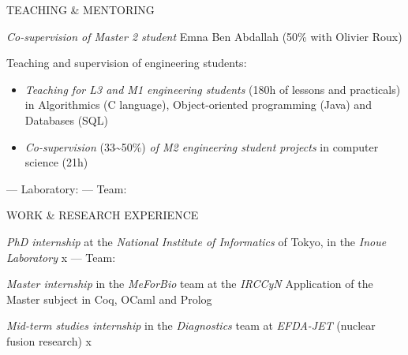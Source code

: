 \documentclass[11pt,a4paper,sans]{moderncv}
\begin{document}
\begin{cvsection}{TEACHING \& MENTORING}

{%
\emph{Co-supervision of Master 2 student} Emna Ben Abdallah (50\% with Olivier Roux)
\begin{itemize}
\end{itemize}
\smallskip
Teaching and supervision of engineering students:
\begin{itemize}
  \item \emph{Teaching for L3 and M1 engineering students} (180h of lessons and practicals) in
Algorithmics (C language), Object-oriented programming (Java) and Databases (SQL)
\item \emph{Co-supervision} (33\textasciitilde50\%) \emph{of M2 engineering student projects} in computer science (21h)
\end{itemize}
}
{}{
 --- Laboratory: 
 --- Team: }

\end{cvsection}



\begin{cvsection}{WORK \& RESEARCH EXPERIENCE}

{\emph{PhD internship} at the \emph{National Institute of Informatics} of Tokyo, in the \emph{Inoue Laboratory}\newline{}
}
{x}{
--- Team: }

\myrule

{\emph{Master internship} in the \emph{MeForBio} team at the \emph{IRCCyN}\newline{}
Application of the Master subject in Coq, OCaml and Prolog}
{}{}
\nopagebreak[4]

\nopagebreak[4]
\myrule

\nopagebreak[4]
{\emph{Mid-term studies internship} in the \emph{Diagnostics} team at \emph{EFDA-JET} (nuclear fusion research)\newline{}
}
{x}{}

\end{cvsection}
\end{document}
